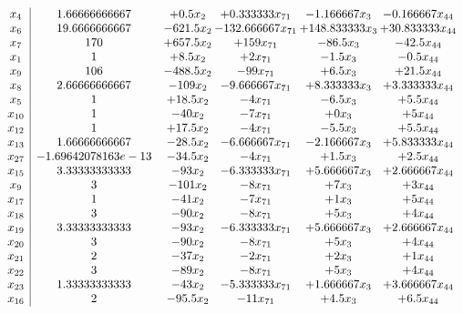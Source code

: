 \documentclass[11pt]{article}
\begin{document}
\[\begin{array}{c| c c@{\hskip 2pt} c@{\hskip 2pt} c@{\hskip 2pt} c@{\hskip 2pt} }
 x_{4}   &  1.66666666667 & + 0.5 x_{2} & + 0.333333 x_{71} & -1.166667 x_{3} & -0.166667 x_{44}\\
 x_{6}   &  19.6666666667 & -621.5 x_{2} & -132.666667 x_{71} & + 148.833333 x_{3} & + 30.833333 x_{44}\\
 x_{7}   &  170 & + 657.5 x_{2} & + 159 x_{71} & -86.5 x_{3} & -42.5 x_{44}\\
 x_{1}   &  1 & + 8.5 x_{2} & + 2 x_{71} & -1.5 x_{3} & -0.5 x_{44}\\
 x_{9}   &  106 & -488.5 x_{2} & -99 x_{71} & + 6.5 x_{3} & + 21.5 x_{44}\\
 x_{8}   &  2.66666666667 & -109 x_{2} & -9.666667 x_{71} & + 8.333333 x_{3} & + 3.333333 x_{44}\\
 x_{5}   &  1 & + 18.5 x_{2} & -4 x_{71} & -6.5 x_{3} & + 5.5 x_{44}\\
 x_{10}   &  1 & -40 x_{2} & -7 x_{71} & + 0 x_{3} & + 5 x_{44}\\
 x_{12}   &  1 & + 17.5 x_{2} & -4 x_{71} & -5.5 x_{3} & + 5.5 x_{44}\\
 x_{13}   &  1.66666666667 & -28.5 x_{2} & -6.666667 x_{71} & -2.166667 x_{3} & + 5.833333 x_{44}\\
 x_{27}   &  -1.69642078163e-13 & -34.5 x_{2} & -4 x_{71} & + 1.5 x_{3} & + 2.5 x_{44}\\
 x_{15}   &  3.33333333333 & -93 x_{2} & -6.333333 x_{71} & + 5.666667 x_{3} & + 2.666667 x_{44}\\
 x_{9}   &  3 & -101 x_{2} & -8 x_{71} & + 7 x_{3} & + 3 x_{44}\\
 x_{17}   &  1 & -41 x_{2} & -7 x_{71} & + 1 x_{3} & + 5 x_{44}\\
 x_{18}   &  3 & -90 x_{2} & -8 x_{71} & + 5 x_{3} & + 4 x_{44}\\
 x_{19}   &  3.33333333333 & -93 x_{2} & -6.333333 x_{71} & + 5.666667 x_{3} & + 2.666667 x_{44}\\
 x_{20}   &  3 & -90 x_{2} & -8 x_{71} & + 5 x_{3} & + 4 x_{44}\\
 x_{21}   &  2 & -37 x_{2} & -2 x_{71} & + 2 x_{3} & + 1 x_{44}\\
 x_{22}   &  3 & -89 x_{2} & -8 x_{71} & + 5 x_{3} & + 4 x_{44}\\
 x_{23}   &  1.33333333333 & -43 x_{2} & -5.333333 x_{71} & + 1.666667 x_{3} & + 3.666667 x_{44}\\
 x_{16}   &  2 & -95.5 x_{2} & -11 x_{71} & + 4.5 x_{3} & + 6.5 x_{44}\\

\end{array}\]
\end{document}
